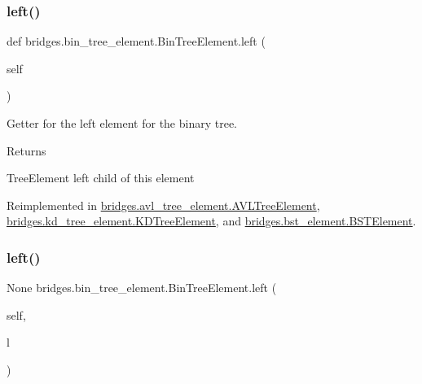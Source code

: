 \mbox{\label{classbridges_1_1bin__tree__element_1_1_bin_tree_element_adb99f8052ef772be4c280970e47e6e0d}} 
\subsubsection{\texorpdfstring{left()}{left()}\hspace{0.1cm}{\footnotesize\ttfamily [1/2]}}
{\footnotesize\ttfamily def bridges.\+bin\+\_\+tree\+\_\+element.\+Bin\+Tree\+Element.\+left (\begin{DoxyParamCaption}\item[{}]{self }\end{DoxyParamCaption})}



Getter for the left element for the binary tree. 

\begin{DoxyReturn}{Returns}


Tree\+Element left child of this element 
\end{DoxyReturn}


Reimplemented in \mbox{\hyperlink{classbridges_1_1avl__tree__element_1_1_a_v_l_tree_element_a717696b26736f5c9585fefc7c5ab88f1}{bridges.\+avl\+\_\+tree\+\_\+element.\+A\+V\+L\+Tree\+Element}}, \mbox{\hyperlink{classbridges_1_1kd__tree__element_1_1_k_d_tree_element_afa4f059c61b3cd9460199c9835641db2}{bridges.\+kd\+\_\+tree\+\_\+element.\+K\+D\+Tree\+Element}}, and \mbox{\hyperlink{classbridges_1_1bst__element_1_1_b_s_t_element_adb40ae0f98fe1cb7f153494c544d3f9f}{bridges.\+bst\+\_\+element.\+B\+S\+T\+Element}}.

\mbox{\label{classbridges_1_1bin__tree__element_1_1_bin_tree_element_a29dc5b117c65774e756b46de45cd2f20}} 
\subsubsection{\texorpdfstring{left()}{left()}\hspace{0.1cm}{\footnotesize\ttfamily [2/2]}}
{\footnotesize\ttfamily  None bridges.\+bin\+\_\+tree\+\_\+element.\+Bin\+Tree\+Element.\+left (\begin{DoxyParamCaption}\item[{}]{self,  }\item[{}]{l }\end{DoxyParamCaption})}



